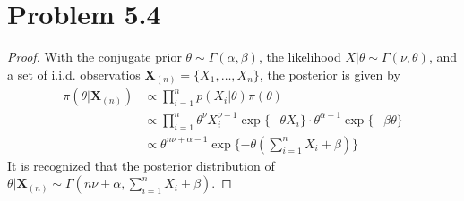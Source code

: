 \section{Problem 5.4}
\begin{proof}
With the conjugate prior $\theta \sim \Gamma(\alpha, \beta)$, the likelihood $X \vert \theta \sim \Gamma(\nu, \theta)$, and a set of i.i.d. observatios $\bm{X}_{(n)} = \{X_1, \dots, X_n\}$, the posterior is given by
\begin{align*}
    \pi(\theta \vert \bm{X}_{(n)}) 
    &\propto \prod_{i=1}^{n} p(X_i \vert \theta) \pi(\theta)\\
    &\propto \prod_{i=1}^{n} \theta^{\nu} X_i^{\nu - 1} \exp\{-\theta X_i\} \cdot \theta^{\alpha-1} \exp\{-\beta\theta\}\\
    &\propto \theta^{n\nu + \alpha-1} \exp \{-\theta (\sum_{i=1}^{n} X_i + \beta)\}
\end{align*}
It is recognized that the posterior distribution of $\theta \vert \bm{X}_{(n)} \sim \Gamma(n\nu+\alpha, \sum_{i=1}^{n}X_i + \beta)$.


\end{proof}
